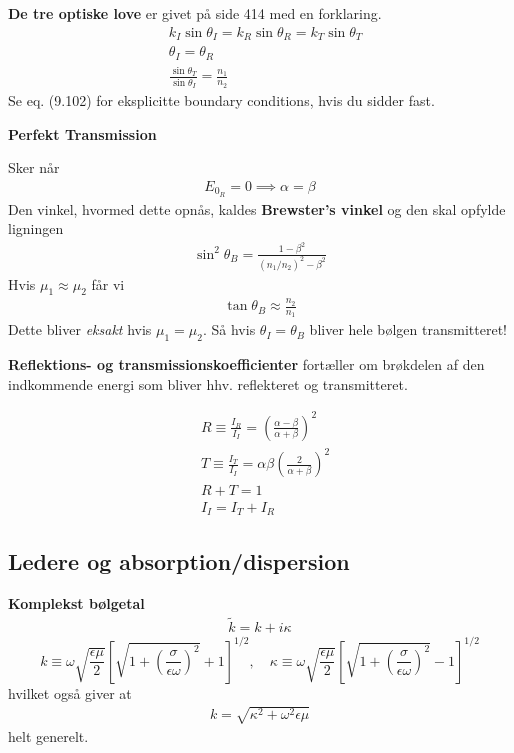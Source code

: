 \documentclass[a4paper]{article}
\begin{document}
    \textbf{De tre optiske love} er givet på side 414 med en forklaring. \begin{align*}
        &k_I \sin  \theta _I = k_R \sin \theta _R = k_T \sin \theta _T \tag{9.99}\\
        &\theta _I = \theta _R \tag{9.100}\\
        &\frac{\sin \theta _T}{\sin \theta _I} = \frac{n_1}{n_2} \tag{9.101}
    \end{align*}
    Se eq. (9.102) for eksplicitte boundary conditions, hvis du sidder fast.
    
    \textbf{Perfekt Transmission}

    Sker når \begin{align*}
        E_{0_R} = 0 \implies \alpha = \beta
    \end{align*}
    Den vinkel, hvormed dette opnås, kaldes \textbf{Brewster's vinkel} og den skal opfylde ligningen \begin{align*}
        \sin ^2 \theta _B = \frac{1 - \beta ^{2} }{(n_1 / n_2)^{2} - \beta ^2} \tag{9.112}
    \end{align*}
    Hvis \(\mu _1 \approx \mu _2\) får vi \begin{align*}
        \tan \theta _B \approx \frac{n_2}{n_1} \tag{9.113}
    \end{align*} 
    Dette bliver \textit{eksakt} hvis \(\mu _1 = \mu _2\). Så hvis \(\theta _I = \theta _B\) bliver hele bølgen transmitteret! 

    \textbf{Reflektions- og transmissionskoefficienter} fortæller om brøkdelen af den indkommende energi som bliver hhv. reflekteret og transmitteret.

    \begin{align*}
        &R \equiv \frac{I_R}{I_I} = \left( \frac{\alpha - \beta }{\alpha + \beta } \right) ^{2} \tag{9.116}\\
        &T \equiv \frac{I_T}{I_I} = \alpha  \beta \left( \frac{2}{\alpha + \beta } \right) ^{2} \tag{9.117}\\
        &R + T = 1\\
        &I_I = I_T + I_R \tag{9.118}
    \end{align*}
    \subsection{Ledere og absorption/dispersion}
    \textbf{Komplekst bølgetal}
    \begin{align*}
        \tilde{k} = k + i \kappa \tag{9.127}
    \end{align*} 
    \[
    k \equiv \omega \sqrt{\frac{\epsilon \mu}{2}} 
    \left[ \sqrt{1 + \left( \frac{\sigma}{\epsilon \omega} \right)^2} + 1 \right]^{1/2}, \quad
    \kappa \equiv \omega \sqrt{\frac{\epsilon \mu}{2}} 
    \left[ \sqrt{1 + \left( \frac{\sigma}{\epsilon \omega} \right)^2} - 1 \right]^{1/2} \tag{9.128}
    \]
    hvilket også giver at \begin{align*}
        k = \sqrt{\kappa ^{2} + \omega ^{2} \epsilon \mu } 
    \end{align*}
    helt generelt.
\end{document}
